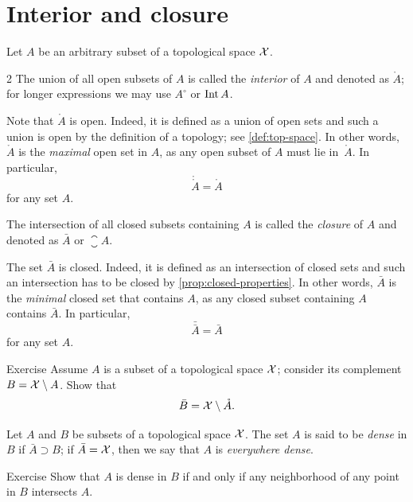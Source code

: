 \section{Interior and closure}

Let $A$ be an arbitrary subset of a topological space $\mathcal{X}$.


\setlength{\columnseprule}{.2pt}
\begin{multicols}{2}
The union of all open subsets of $A$ is called the \emph{interior} of $A$ and denoted as $\mathring A$;
for longer expressions we may use $A^\circ$ or $\mathop{\rm Int}\nolimits A$.

Note that $\mathring A$ is open.
Indeed, it is defined as a union of open sets and such a union is open by the definition of a topology; see \ref{def:top-space}.
In other words, $\mathring A$ is the \textit{maximal} open set in $A$,
as any open subset of $A$ must lie in~$\mathring A$.
In particular,
\[\mathring{\mathring A}=\mathring A\] for any set $A$.

\columnbreak

The intersection of all closed subsets containing $A$ is called the \emph{closure} of $A$ and denoted as $\bar A$ or $\closure A$.

The set $\bar A$ is closed.
Indeed, it is defined as an intersection of closed sets and such an intersection has to be closed by \ref{prop:closed-properties}.
In other words, $\bar A$ is the \textit{minimal} closed set that contains $A$,
as any closed subset containing $A$ contains $\bar A$.
In particular,
\[\bar{\bar A}=\bar A\]
for any set $A$.
\end{multicols}


\begin{thm}{Exercise}\label{ex:closure-interior-complement}
Assume $A$ is a subset of a topological space $\mathcal{X}$;
consider its complement $B=\mathcal{X}\setminus A$.
Show that 
\[\bar B=\mathcal{X}\setminus \mathring A.\]
\end{thm}

Let $A$ and $B$ be subsets of a topological space $\mathcal{X}$.
The set $A$ is said to be \emph{dense} in $B$ if $\bar A\supset B$;
if $\bar A=\mathcal{X}$, then we say that $A$ is \emph{everywhere dense}.

\begin{thm}{Exercise}\label{ex:dense-nbhd}
Show that $A$ is dense in $B$ if and only if any neighborhood of any point in $B$ intersects $A$.
\end{thm}


